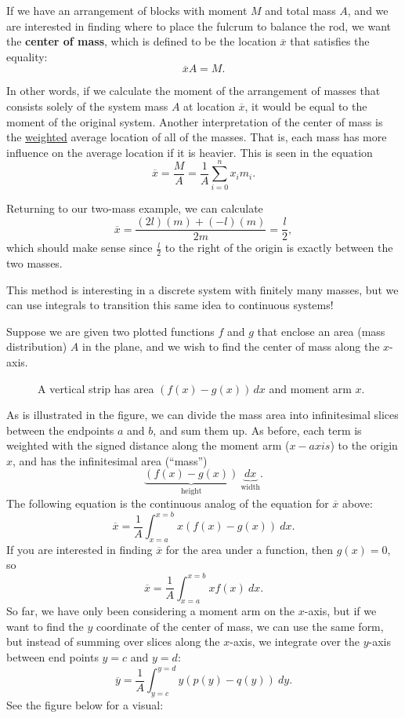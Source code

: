 If we have an arrangement of blocks with moment $M$ and total mass $A$, and we are interested in finding where to place the fulcrum to balance the rod, we want the \textbf{center of mass}, which is defined to be the location $\overline{x}$ that satisfies the equality:
$$
\overline{x}A=M.
$$

In other words, if we calculate the moment of the arrangement of masses that consists solely of the system mass $A$ at location $\overline{x}$, it would be equal to the moment of the original system. Another interpretation of the center of mass is the \underline{weighted} average location of all of the masses. That is, each mass has more influence on the average location if it is heavier. This is seen in the equation
$$\overline{x}=\frac{M}{A}=\frac{1}{A}\sum_{i=0}^nx_im_i.$$


Returning to our two-mass example, we can calculate
$$\overline{x}=\frac{(2l)(m)+(-l)(m)}{2m}=\frac{l}{2},$$
which should make sense since $\frac{l}{2}$ to the right of the origin is exactly between the two masses.

This method is interesting in a discrete system with finitely many masses, but we can use integrals to transition this same idea to continuous systems!

Suppose we are given two plotted functions $f$ and $g$ that enclose an area (mass distribution) $A$ in the plane, and we wish to find the center of mass along the $x$-axis.


\begin{figure}[H]
\centering

\caption{A vertical strip has area $(f(x)-g(x))\,dx$ and moment arm $x$.}
\end{figure}

As is illustrated in the figure, we can divide the mass area into infinitesimal slices between the endpoints $a$ and $b$, and sum them up. As before, each term is weighted with the signed distance along the moment arm ($x-axis$) to the origin $x$, and has the infinitesimal area (``mass'')
$$\underbrace{(f(x)-g(x))}_\text{height}\ \underbrace{dx}_\text{width}.$$
The following equation is the continuous analog of the equation for $\overline{x}$ above:
$$
\overline{x} = \frac{1}{A}\int_{x=a}^{x=b}x(f(x)-g(x))\ dx.
$$
If you are interested in finding $\overline{x}$ for the area under a function, then $g(x)=0$, so
$$
\overline{x} = \frac{1}{A}\int_{x=a}^{x=b}xf(x)\ dx.
$$
So far, we have only been considering a moment arm on the $x$-axis, but if we want to find the $y$ coordinate of the center of mass, we can use the same form, but instead of summing over slices along the $x$-axis, we integrate over the $y$-axis between end points $y=c$ and $y=d$:
$$
\overline{y} = \frac{1}{A}\int_{y=c}^{y=d}y(p(y)-q(y))\ dy.
$$
See the figure below for a visual:


